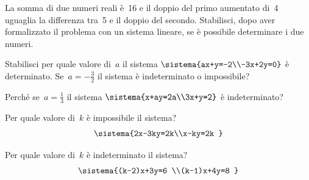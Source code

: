 \begin{esercizio}
 \label{ese:22.34}
La somma di due numeri reali è~16 e il doppio del
primo aumentato di~4 uguaglia la differenza tra~5 e il doppio del
secondo. Stabilisci, dopo aver formalizzato il problema con un sistema
lineare, se è possibile determinare i due numeri.
\end{esercizio}

\begin{esercizio}
 \label{ese:22.35}
Stabilisci per quale valore di~\(a\) il sistema
\(\sistema{ax+y=-2\\-3x+2y=0}\) è
determinato. Se~\(a=-{\frac{3}{2}}\) il sistema è indeterminato o
impossibile?
\end{esercizio}

\begin{esercizio}
 \label{ese:22.36}
Perché se~\(a=\frac{1}{3}\) il sistema
\(\sistema{x+ay=2a\\3x+y=2}\) è
indeterminato?
\end{esercizio}

\begin{esercizio}
 \label{ese:22.37}
Per quale valore di~\(k\) è impossibile il sistema?
\[\sistema{2x-3ky=2k\\x-ky=2k }\]
\end{esercizio}

\begin{esercizio}
 \label{ese:22.38}
Per quale valore di~\(k\) è indeterminato il sistema?
\[\sistema{(k-2)x+3y=6 \\(k-1)x+4y=8 }\]
\end{esercizio}

